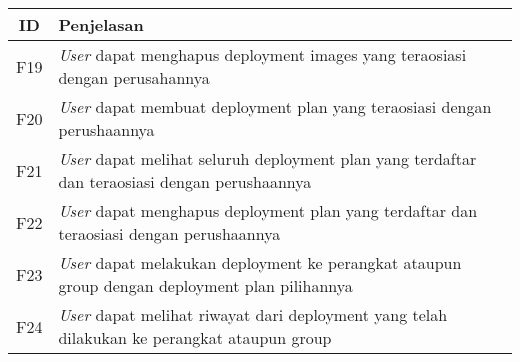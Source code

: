 \bgroup
\begin{table}[ht]
  \def\arraystretch{1.7}
  \centering
  \begin{tabular}{|c|p{12cm}|}
    \hline
    ID  & Penjelasan                                                                                            \\

    \hline
    F19 & \textit{User} dapat menghapus deployment images yang teraosiasi dengan perusahannya                   \\
    \hline
    F20 & \textit{User} dapat membuat deployment plan yang teraosiasi dengan perushaannya                       \\
    \hline
    F21 & \textit{User} dapat melihat seluruh deployment plan yang terdaftar dan teraosiasi dengan perushaannya \\
    \hline
    F22 & \textit{User} dapat menghapus deployment plan yang terdaftar dan teraosiasi dengan perushaannya       \\
    \hline
    F23 & \textit{User} dapat melakukan deployment ke perangkat ataupun group dengan deployment plan pilihannya \\
    \hline
    F24 & \textit{User} dapat melihat riwayat dari deployment yang telah dilakukan ke perangkat ataupun group   \\
    \hline
  \end{tabular}
\end{table}
\egroup

\pagebreak

